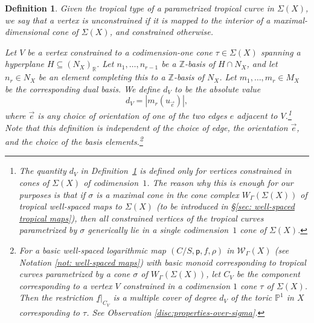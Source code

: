 \documentclass{article}
\def\cW{\mathcal{W}}
\newtheorem{definition}{Definition}[section]
\begin{document}
    
     \begin{definition} \label{def: dv}
         Given the tropical type of a parametrized tropical curve in $\Sigma(X)$, we say that a vertex is unconstrained if it is mapped to the interior of a maximal-dimensional cone of $\Sigma(X)$, and constrained otherwise.

    Let $V$ be a vertex constrained to a codimension-one cone $\tau \in \Sigma(X)$ spanning a hyperplane $H \subseteq (N_X)_\mathbb{R}$. Let $n_1, \ldots, n_{r-1}$ be a $\mathbb{Z}$-basis of $H \cap N_X$, and let $n_r \in N_X$ be an element completing this to a $\mathbb{Z}$-basis of $N_X$. Let $m_1, \ldots, m_r \in M_X$ be the corresponding dual basis. We define $d_V$ to be the absolute value 
\[
d_V = |m_r(u_{\vec{e}})|,
\]
where $\vec{e}$ is any choice of orientation of one of the two edges $e$ adjacent to $V$.\footnote{The quantity $d_V$ in Definition~\ref{def: dv} is defined only for vertices constrained in cones of $\Sigma(X)$ of codimension~$1$. The reason why this is enough for our purposes is that if $\sigma$ is a maximal cone in the cone complex $W_\Gamma(\Sigma(X))$ of tropical well-spaced maps to $\Sigma(X)$ (to be introduced in \S\ref{sec: well-spaced tropical maps}), then all constrained vertices of the tropical curves parametrized by $\sigma$ generically lie in a single codimension~$1$ cone of $\Sigma(X)$.} Note that this definition is independent of the choice of edge, the orientation $\vec{e}$, and the choice of the basis elements.\footnote{For a basic well-spaced logarithmic map $(C/S,\mathsf{p}, f, \rho)$ in $\cW_\Gamma(X)$ (see Notation \ref{not: well-spaced maps}) with basic monoid corresponding to tropical curves parametrized by a cone $\sigma$ of $W_\Gamma(\Sigma(X))$, let $C_V$ be the component corresponding to a vertex $V$ constrained in a codimension $1$ cone $\tau$ of $\Sigma(X)$. Then the restriction $\underline{f}|_{C_V}$ is a multiple cover of degree $d_V$ of the toric $\mathbb{P}^1$ in $X$ corresponding to $\tau$. See Observation \ref{disc:properties-over-sigma}.}
    \end{definition}


    
    
\end{document}
